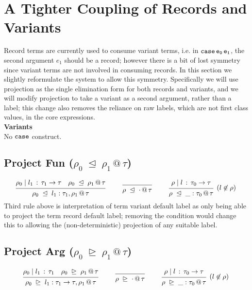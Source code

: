 \documentclass{article}
\makeatletter
\newcommand{\case}[2]{\tt{case}\,#1\,#2}
\newcommand{\haslbl}[3]{#1\;|\;#2\,:\, #3}
\newcommand{\projFunRule}[3]{#1 \;\trianglelefteq\; #2 \,@\, #3}
\newcommand{\projArgRule}[3]{#1 \;\trianglerighteq\; #2 \,@\, #3}
\newcommand{\deduct}[3][]
{
  \begin{prooftree}
    \hypo{#2}
    \infer1[\text{#1}]{#3}
  \end{prooftree}
}
\makeatother
\begin{document}
\section{A Tighter Coupling of Records and Variants}
Record terms are currently used to consume variant terms, i.e. in
$\case{e_0}{e_1}$, the second argument $e_1$ should be a record;
however there is a bit of lost symmetry since variant terms are not
involved in consuming records. In this section we slightly reformulate
the system to allow this symmetry. Specifically we will use projection
as the single elimination form for both records and variants, and we
will modify projection to take a variant as a second argument, rather
than a label; this change also removes the reliance on raw labels,
which are not first class values, in the core expressions.
\\

\noindent
\textbf{Variants}
\\
No $\tt{case}$ construct.
\\

\subsection{Project Fun \;($\projFunRule{\rho_0}{\rho_1}{\tau}$)}
\label{subsec:case-constraint}
\[
\deduct
    {\haslbl{\rho_0}{l_1}{\tau_1\to\tau} \quad \projFunRule{\rho_0}{\rho_1}{\tau}}
    {\projFunRule{\rho_0}{l_1:\tau_1,\rho_1}{\tau}}
    {}
\qquad
\deduct
    {}
    {\projFunRule{\rho}{\cdot}{\tau}}
    {}
\qquad
\deduct
    {\haslbl{\rho}{l}{\tau_0\to\tau}}
    {\projFunRule{\rho}{\_:\tau_0}{\tau}}
    {(l\not\in\rho)}
\]
Third rule above is interpretation of term variant default label as
only being able to project the term record default label; removing the
condition would change this to allowing the (non-deterministic)
projection of any suitable label.

\subsection{Project Arg \;($\projArgRule{\rho_0}{\rho_1}{\tau}$)}
\label{subsec:case-constraint}
\[
\deduct
    {\haslbl{\rho_0}{l_1}{\tau_1} \quad \projArgRule{\rho_0}{\rho_1}{\tau}}
    {\projArgRule{\rho_0}{l_1:\tau_1\to\tau,\rho_1}{\tau}}
    {}
\qquad
\deduct
    {}
    {\projArgRule{\rho}{\cdot}{\tau}}
    {}
\qquad
\deduct
    {\haslbl{\rho}{l}{\tau_0\to\tau}}
    {\projArgRule{\rho}{\_:\tau_0}{\tau}}
    {(l\not\in\rho)}
\]
\\
\end{document}
